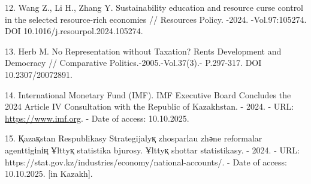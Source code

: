 \begin{refs}
12. Wang Z., Li H., Zhang Y. Sustainability education and resource curse
control in the selected resource-rich economies // Resources Policy.
-2024. -Vol.97:105274. DOI 10.1016/j.resourpol.2024.105274.

13. Herb M. No Representation without Taxation? Rents Development and
Democracy // Comparative Politics.-2005.-Vol.37(3).- P.297-317. DOI
10.2307/20072891.

14. International Monetary Fund (IMF). IMF Executive Board Concludes the
2024 Article IV Consultation with the Republic of Kazakhstan. - 2024. - URL:
\href{https://www.imf.org/en/news/articles/2025/01/30/pr25021-kazakhstan-executive-board-concludes-2024-article-iv-consult}{https://www.imf.org}. - Date of access: 10.10.2025.

15. Қazaқstan Respublikasy Strategijalyқ zhosparlau zhәne reformalar
agenttіgіnің Ұlttyқ statistika bjurosy. Ұlttyқ shottar statistikasy. -
2024. - URL: https://stat.gov.kz/industries/economy/national-accounts/.
- Date of access: 10.10.2025. {[}in Kazakh{]}.
\end{refs}


